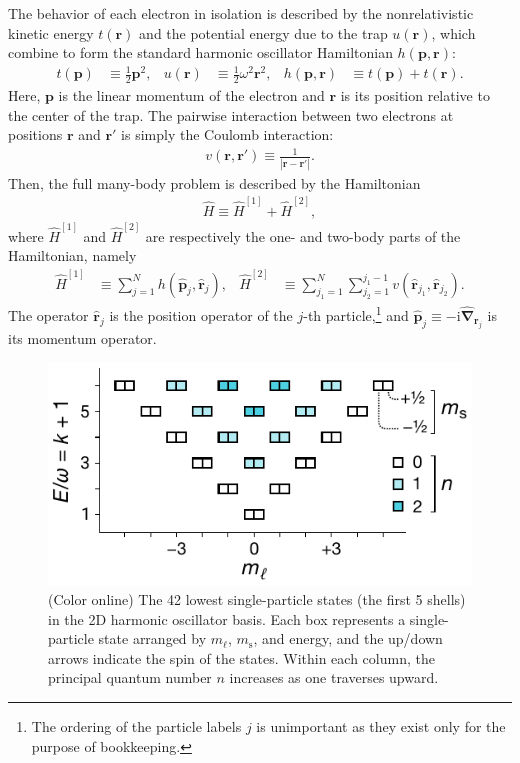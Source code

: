 The behavior of each electron in isolation is described by the nonrelativistic kinetic energy $t(\bm{r})$ and the potential energy due to the trap $u(\bm{r})$, which combine to form the standard harmonic oscillator Hamiltonian $h(\bm{p}, \bm{r})$:
\begin{align*}
  t(\bm{p}) &\equiv \frac{1}{2} \bm{p}^2, &
  u(\bm{r}) &\equiv \frac{1}{2} \omega^2 \bm{r}^2, &
  h(\bm{p}, \bm{r}) &\equiv t(\bm{p}) + t(\bm{r}).
\end{align*}
Here, $\bm{p}$ is the linear momentum of the electron and $\bm{r}$ is
its position relative to the center of the trap.  The pairwise
interaction between two electrons at positions $\bm{r}$ and $\bm{r}'$
is simply the Coulomb interaction:
\begin{align*}
  v(\bm{r}, \bm{r}') \equiv \frac{1}{|\bm{r} - \bm{r}'|}.
\end{align*}
Then, the full many-body problem is described by the Hamiltonian
\begin{align*}
  \hat H \equiv \hat H^{[1]} + \hat H^{[2]},
\end{align*}
where $\hat{H}^{[1]}$ and $\hat{H}^{[2]}$ are respectively the one- and two-body parts of the Hamiltonian, namely
\begin{align} \label{eq:onetwobodyhamiltonian}
\hat{H}^{[1]} &\equiv \sum_{j = 1}^N h(\hat{\bm p}_j, \hat{\bm r}_j), &
\hat{H}^{[2]} &\equiv \sum_{j_1 = 1}^N \sum_{j_2 = 1}^{j_1 - 1} v(\hat{\bm r}_{j_1}, \hat{\bm r}_{j_2}).
\end{align}
The operator $\hat{\bm r}_j$ is the position operator of the $j$-th
particle,\footnote{The ordering of the particle labels $j$ is
unimportant as they exist only for the purpose of bookkeeping.} and
$\hat{\bm p}_j \equiv -\mathrm{i} \hat{\bm{\nabla}}_{\bm{r}_j}$ is its
momentum operator.

\begin{figure}
  \includegraphics{figures/fig-shell-structure-v2.pdf}
  \caption{(Color online) The 42 lowest single-particle states (the first 5 shells) in the 2D harmonic oscillator basis.  Each box represents a single-particle state arranged by $m_\ell$, $m_{\mathrm{s}}$, and energy, and the up/down arrows indicate the spin of the states.  Within each column, the principal quantum number $n$ increases as one traverses upward.}
  \label{fig:shell-structure}
\end{figure}

